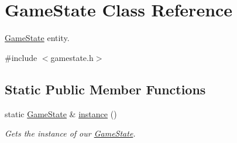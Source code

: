 \hypertarget{class_game_state}{}\section{Game\+State Class Reference}
\label{class_game_state}


\mbox{\hyperlink{class_game_state}{Game\+State}} entity.  




{\ttfamily \#include $<$gamestate.\+h$>$}

\subsection*{Static Public Member Functions}
\begin{DoxyCompactItemize}
\item 
static \mbox{\hyperlink{class_game_state}{Game\+State}} \& \mbox{\hyperlink{class_game_state_a1429b5b681e581c11a11f19e28968cd9}{instance}} ()
\begin{DoxyCompactList}\small\item\em Gets the instance of our \mbox{\hyperlink{class_game_state}{Game\+State}}. \end{DoxyCompactList}\end{DoxyCompactItemize}
